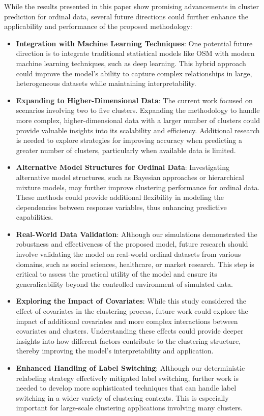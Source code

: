 \documentclass{article}
\begin{document}
While the results presented in this paper show promising advancements in cluster prediction for ordinal data, several future directions could further enhance the applicability and performance of the proposed methodology:

\begin{itemize}
    \item \textbf{Integration with Machine Learning Techniques}: One potential future direction is to integrate traditional statistical models like OSM with modern machine learning techniques, such as deep learning. This hybrid approach could improve the model's ability to capture complex relationships in large, heterogeneous datasets while maintaining interpretability.

    \item \textbf{Expanding to Higher-Dimensional Data}: The current work focused on scenarios involving two to five clusters. Expanding the methodology to handle more complex, higher-dimensional data with a larger number of clusters could provide valuable insights into its scalability and efficiency. Additional research is needed to explore strategies for improving accuracy when predicting a greater number of clusters, particularly when available data is limited.

    \item \textbf{Alternative Model Structures for Ordinal Data}: Investigating alternative model structures, such as Bayesian approaches or hierarchical mixture models, may further improve clustering performance for ordinal data. These methods could provide additional flexibility in modeling the dependencies between response variables, thus enhancing predictive capabilities.

    \item \textbf{Real-World Data Validation}: Although our simulations demonstrated the robustness and effectiveness of the proposed model, future research should involve validating the model on real-world ordinal datasets from various domains, such as social sciences, healthcare, or market research. This step is critical to assess the practical utility of the model and ensure its generalizability beyond the controlled environment of simulated data.

    \item \textbf{Exploring the Impact of Covariates}: While this study considered the effect of covariates in the clustering process, future work could explore the impact of additional covariates and more complex interactions between covariates and clusters. Understanding these effects could provide deeper insights into how different factors contribute to the clustering structure, thereby improving the model's interpretability and application.

    \item \textbf{Enhanced Handling of Label Switching}: Although our deterministic relabeling strategy effectively mitigated label switching, further work is needed to develop more sophisticated techniques that can handle label switching in a wider variety of clustering contexts. This is especially important for large-scale clustering applications involving many clusters.

\end{itemize}
\end{document}
